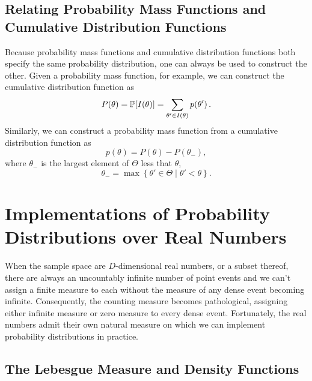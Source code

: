 \subsection{Relating Probability Mass Functions and Cumulative 
Distribution Functions}

Because probability mass functions and cumulative distribution functions 
both specify the same probability distribution, one can always be used to 
construct the other.  Given a probability mass function, for example, we 
can construct the cumulative distribution function as
%
\begin{equation*}
P \! \left( \theta \right)
= \mathbb{P} \! \left[ I \! \left( \theta \right) \right]
= \sum_{\theta' \in I ( \theta )} p \! \left( \theta' \right).
\end{equation*}
%
Similarly, we can construct a probability mass function from a cumulative
distribution function as
%
\begin{equation*}
p \! \left( \theta \right) = 
P \! \left( \theta \right)
- P \! \left( \theta_{-} \right),
\end{equation*}
%
where $\theta_{-}$ is the largest element of $\Theta$ less that $\theta$,
%
\begin{equation*}
\theta_{-} = \max \left\{ \theta' \in \Theta \mid \theta' < \theta \right\}.
\end{equation*}

\section{Implementations of Probability Distributions over Real
Numbers}

When the sample space are $D$-dimensional real numbers, or
a subset thereof, there are always an uncountably infinite number 
of point events and we can't assign a finite measure to each without
the measure of any dense event becoming infinite.  Consequently,
the counting measure becomes pathological, assigning either infinite 
measure or zero measure to every dense event.  Fortunately, the real 
numbers admit their own natural measure on which we can implement 
probability distributions in practice.

\subsection{The Lebesgue Measure and Density Functions}

